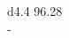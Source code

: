 \documentclass[border = 1mm]{standalone}
\begin{document}
    
\begin{tabular}{d{4.4}}
    96.28 \\
    - \\
     \\
    \hline\\
\end{tabular}
\end{document}
